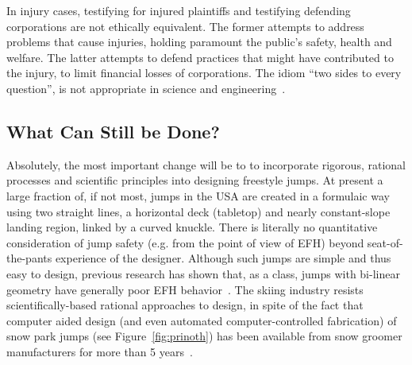 \documentclass[smallextended]{svjour3}       %
\begin{document}
In injury cases, testifying for injured plaintiffs and testifying defending
corporations are not ethically equivalent. The former attempts to address
problems that cause injuries, holding paramount the public's safety, health and
welfare. The latter attempts to defend practices that might have contributed to
the injury, to limit financial losses of corporations. The idiom ``two
sides to every question'', is not appropriate in science and
engineering~\cite[page 268]{Oreskes2010}.





\subsection{What Can Still be Done?}
\label{sec:action}
Absolutely, the most important change will be to to incorporate rigorous, rational  processes and scientific principles into designing freestyle jumps. At present a large fraction of, if not most, jumps in the USA are created in a formulaic way using two straight lines, a horizontal deck (tabletop) and nearly constant-slope landing region, linked by a curved knuckle. There is literally no quantitative consideration of jump safety (e.g. from the point of view of EFH) beyond seat-of-the-pants experience of the designer. Although such jumps are simple and thus easy to design, previous research has shown that, as a class, jumps with bi-linear geometry have generally poor EFH behavior~\cite{Swedberg2012}. The skiing industry resists scientifically-based rational approaches to design, in spite of the fact that computer aided design (and even automated computer-controlled fabrication) of snow park jumps (see Figure~\ref{fig:prinoth}) has been available from snow groomer manufacturers for more than 5 years~\cite{Muigg2121,Prinoth2121}.
\end{document}

